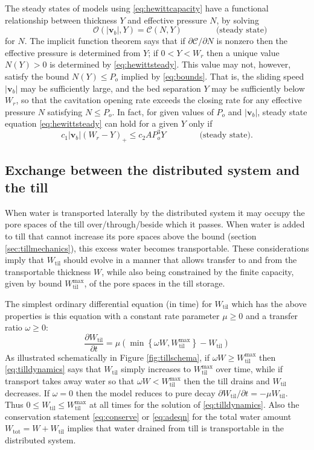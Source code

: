 \documentclass[11pt,final]{amsart}
\newcommand\bv{\mathbf{v}}
\newcommand{\Wtil}{W_{\text{til}}}
\newcommand{\Wtilmax}{W_{\text{til}}^{\text{max}}}
\newcommand{\Wtot}{W_{\text{tot}}}
\begin{document}
The steady states of models using \eqref{eq:hewittcapacity} have a functional relationship between thickness $Y$ and effective pressure $N$, by solving
\begin{equation}
\phantom{foo} \qquad \qquad \mathcal{O}(|\bv_b|,Y) = \mathcal{C}(N,Y) \qquad \qquad \text{(steady state)} \label{eq:hewittsteady}
\end{equation}
for $N$.  The implicit function theorem says that if $\partial\mathcal{C}/\partial N$ is nonzero then the effective pressure is determined from $Y$; if $0<Y<W_r$ then a unique value $N(Y)>0$ is determined by \eqref{eq:hewittsteady}.  This value may not, however, satisfy the bound $N(Y) \le P_o$ implied by \eqref{eq:bounds}.  That is, the sliding speed $|\bv_b|$ may be sufficiently large, and the bed separation $Y$ may be sufficiently below $W_r$, so that the cavitation opening rate exceeds the closing rate for any effective pressure $N$ satisfying $N\le P_o$.  In fact, for given values of $P_o$ and $|\bv_b|$, steady state equation \eqref{eq:hewittsteady} can hold for a given $Y$ only if
\begin{equation}
c_1 |\bv_b| (W_r - Y)_+ \le c_2 A P_o^3 Y \qquad \qquad \text{(steady state)}. \label{eq:steadyOCbound}
\end{equation}


\subsection*{Exchange between the distributed system and the till}  When water is transported laterally by the distributed system it may occupy the pore spaces of the till over/through/beside which it passes.  When water is added to till that cannot increase its pore spaces above the bound (section \ref{sec:tillmechanics}), this excess water becomes transportable.  These considerations imply that $\Wtil$ should evolve in a manner that allows transfer to and from the transportable thickness $W$, while also being constrained by the finite capacity, given by bound $\Wtilmax$, of the pore spaces in the till storage.

The simplest ordinary differential equation (in time) for $\Wtil$ which has the above properties is this equation with a constant rate parameter $\mu\ge 0$ and a transfer ratio $\omega\ge 0$:
\begin{equation}
\frac{\partial \Wtil}{\partial t} = \mu \left(\min\left\{\omega W,\Wtilmax\right\} - \Wtil\right) \label{eq:tilldynamics}
\end{equation}
As illustrated schematically in Figure \ref{fig:tillschema}, if $\omega W \ge \Wtilmax$ then \eqref{eq:tilldynamics} says that $\Wtil$ simply increases to $\Wtilmax$ over time, while if transport takes away water so that $\omega W < \Wtilmax$ then the till drains and $\Wtil$ decreases.  If $\omega=0$ then the model reduces to pure decay $\partial \Wtil/\partial t = - \mu \Wtil$.  Thus $0\le \Wtil \le \Wtilmax$ at all times for the solution of \eqref{eq:tilldynamics}.  Also the conservation statement \eqref{eq:conserve} or \eqref{eq:adeqn} for the total water amount $\Wtot=W+\Wtil$ implies that water drained from till is transportable in the distributed system.
\end{document}

